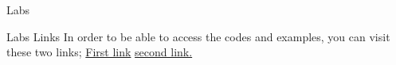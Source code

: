 \documentclass{beamer}\usepackage[]{graphicx}\usepackage[]{xcolor}
\begin{document}
\begin{frame}{Labs}
    \begin{alertblock}{Labs Links}
        In order to be able to access the codes and examples, you can visit these two links;
        \href{https://github.com/stats9/R_Fancy/blob/master/WorkShopSums/Beemer_Present/WorkShopSums_code_template.ipynb}{First link}
        \href{https://github.com/stats9/R_Fancy/blob/master/WorkShopSums/WorkShop_1_Sums_R_Programming.md}{second link.}
    \end{alertblock}

\end{frame}
\end{document}
